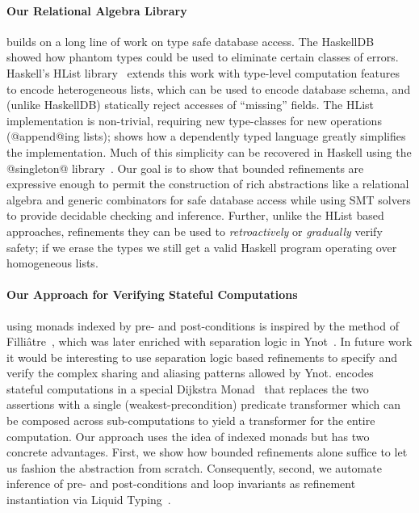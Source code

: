 \paragraph{Our Relational Algebra Library} builds on a long
line of work on type safe database access.
%
The HaskellDB~\citep{haskellDB}
showed how phantom types could be used to eliminate
certain classes of errors.
%
Haskell's HList library~\citep{heterogeneous}
extends this work with type-level computation
features to encode heterogeneous lists, which
can be used to encode database schema, and
(unlike HaskellDB) statically reject accesses
of ``missing'' fields.
%
The HList implementation is non-trivial,
requiring new type-classes for new operations
(\eg @append@ing lists); \citep{thepipower}
shows how a dependently typed language greatly
simplifies the implementation.
%
Much of this simplicity can be recovered in
Haskell using the @singleton@ library~\citep{Weirich12}.
%
Our goal is to show that bounded refinements
are expressive enough to permit the construction
of rich abstractions like a relational algebra
and generic combinators for safe database access
while using SMT solvers to provide decidable
checking and inference. Further, unlike the
HList based approaches, refinements they can
be used to \emph{retroactively} or \emph{gradually}
verify safety; if we erase the types we still
get a valid Haskell program operating over
homogeneous lists.


\paragraph{Our Approach for Verifying Stateful Computations} using monads
indexed by pre- and post-conditions is inspired by the method of
Filli\^atre~\citep{Filliatre98}, which was later enriched with
separation logic in Ynot~\citep{ynot}. In future work it would
be interesting to use separation logic based refinements to specify
and verify the complex sharing and aliasing patterns allowed by Ynot.
%
\fstar encodes stateful computations in a special Dijkstra
Monad~\citep{dijkstramonad} that replaces the two assertions with
a single (weakest-precondition) predicate transformer which
can be composed across sub-computations to yield a transformer
for the entire computation.
%
Our \RIO approach uses the idea of indexed monads but
has two concrete advantages.
%
First, we show how bounded refinements alone suffice to
let us fashion the \RIO abstraction from scratch.
%
Consequently, second, we automate inference of pre- and
post-conditions and loop invariants as refinement instantiation
via Liquid Typing~\citep{LiquidPLDI08}.


